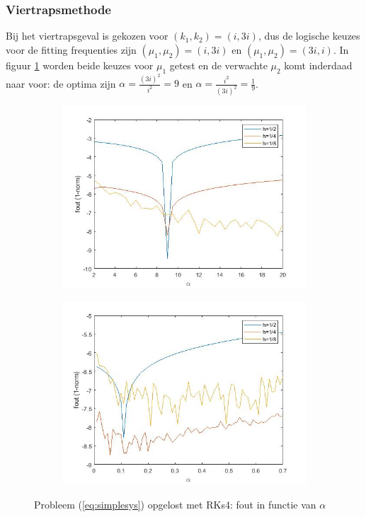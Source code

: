 \documentclass[12pt]{article}
\begin{document}
\subsubsection{Viertrapsmethode}
Bij het viertrapsgeval is gekozen voor \((k_1,k_2)=(i,3i)\), dus de logische keuzes voor de fitting frequenties zijn \((\mu_1,\mu_2)=(i,3i)\) en \((\mu_1,\mu_2)=(3i,i)\). In figuur \ref{fig:simplealphasrks4} worden beide keuzes voor \(\mu_1\) getest en de verwachte \(\mu_2\) komt inderdaad naar voor: de optima zijn \(\alpha=\frac{(3i)^2}{i^2}=9\) en \(\alpha=\frac{i^2}{(3i)^2}=\frac{1}{9}\).
\begin{figure}[H]
    \centering
    \begin{subfigure}{0.49\textwidth}
        \includegraphics[width=\textwidth]{simple_i_RKs4.jpg}
    \end{subfigure}
    \begin{subfigure}{0.49\textwidth}
        \includegraphics[width=\textwidth]{simple_2i_RKs4.jpg}
    \end{subfigure}
    \caption{Probleem (\ref{eq:simplesys}) opgelost met RKs4: fout in functie van \(\alpha\)}
    \label{fig:simplealphasrks4}
\end{figure}
\end{document}
